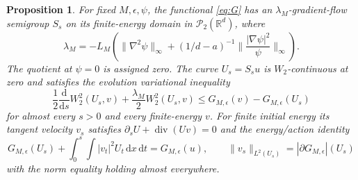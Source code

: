 \documentclass[11pt]{article}
\numberwithin{equation}{section}
\newtheorem{proposition}[theorem]{Proposition}
\theoremstyle{definition}
\theoremstyle{remark}
\newcommand{\R}{\mathbb R}
\newcommand{\Ptwo}{\mathcal P_2(\R^d)}
\newcommand{\dd}{\,\mathrm d}
\newcommand{\Div}{\operatorname{div}}
\newcommand{\norm}[1]{\lVert #1\rVert}
\begin{document}
\begin{proposition}\label{prop:metric-flow}
For fixed $M,\epsilon,\psi$, the functional \eqref{eq:G} has an
$\lambda_M$-gradient-flow semigroup $S_s$ on its finite-energy domain in
$\Ptwo$, where
\begin{equation}\label{eq:lambda}
 \lambda_M=-L_M\left(\norm{\nabla^2\psi}_\infty
   +(1/d-a)^{-1}\norm{\frac{|\nabla\psi|^2}{\psi}}_\infty\right).
\end{equation}
The quotient at $\psi=0$ is assigned zero. The curve $U_s=S_su$ is
$W_2$-continuous at zero and satisfies the evolution variational inequality
\begin{equation}\label{eq:EVI}
 \frac12\frac{\mathrm d}{\mathrm ds}W_2^2(U_s,v)
      +\frac{\lambda_M}{2}W_2^2(U_s,v)
       \le G_{M,\epsilon}(v)-G_{M,\epsilon}(U_s)
\end{equation}
for almost every $s>0$ and every finite-energy $v$.
For finite initial energy its tangent velocity $v_s$ satisfies
$\partial_sU+\Div(Uv)=0$ and the energy/action identity
\[
 G_{M,\epsilon}(U_s)+\int_0^s\!\int|v_t|^2U_t\dd x\dd t
       =G_{M,\epsilon}(u),\qquad
 \norm{v_s}_{L^2(U_s)}=|\partial G_{M,\epsilon}|(U_s)
\]
with the norm equality holding almost everywhere.
\end{proposition}
\end{document}
